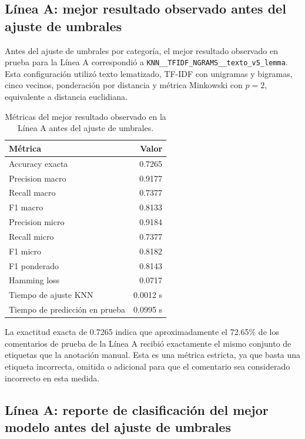 \documentclass[12pt,a4paper]{article}
\newcommand{\code}[1]{\nolinkurl{#1}}
\begin{document}
\subsection{Línea A: mejor resultado observado antes del ajuste de umbrales}

Antes del ajuste de umbrales por categoría, el mejor resultado observado en prueba para la Línea A correspondió a \code{KNN\_\_TFIDF\_NGRAMS\_\_texto\_v5\_lemma}. Esta configuración utilizó texto lematizado, TF-IDF con unigramas y bigramas, cinco vecinos, ponderación por distancia y métrica Minkowski con $p=2$, equivalente a distancia euclidiana.

\begin{table}[htbp]
\centering
\caption{Métricas del mejor resultado observado en la Línea A antes del ajuste de umbrales.}
\label{tab:mejor_modelo_a}
\small
\begin{tabular}{lr}
\toprule
\textbf{Métrica} & \textbf{Valor} \\
\midrule
Accuracy exacta & 0.7265 \\
Precision macro & 0.9177 \\
Recall macro & 0.7377 \\
F1 macro & 0.8133 \\
Precision micro & 0.9184 \\
Recall micro & 0.7377 \\
F1 micro & 0.8182 \\
F1 ponderado & 0.8143 \\
Hamming loss & 0.0717 \\
Tiempo de ajuste KNN & 0.0012 s \\
Tiempo de predicción en prueba & 0.0995 s \\
\bottomrule
\end{tabular}
\end{table}
\FloatBarrier

La exactitud exacta de 0.7265 indica que aproximadamente el 72.65\% de los comentarios de prueba de la Línea A recibió exactamente el mismo conjunto de etiquetas que la anotación manual. Esta es una métrica estricta, ya que basta una etiqueta incorrecta, omitida o adicional para que el comentario sea considerado incorrecto en esta medida.

\subsection{Línea A: reporte de clasificación del mejor modelo antes del ajuste de umbrales}
\end{document}
